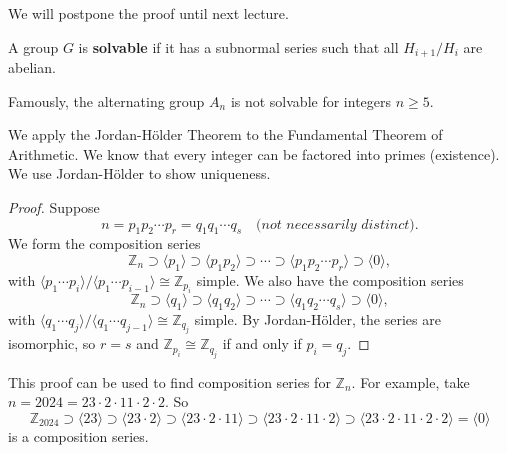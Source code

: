 We will postpone the proof until next lecture.

\begin{definition}
	A group $G$ is \textbf{solvable} if it has a subnormal series such that all $H_{i+1}/H_i$ are abelian.
\end{definition}

\begin{example}
	Famously, the alternating group $A_n$ is not solvable for integers $n\geq 5$.
\end{example}

\begin{example}
	We apply the Jordan-Hölder Theorem to the Fundamental Theorem of Arithmetic. We know that every integer can be factored into primes (existence). We use Jordan-Hölder to show uniqueness.

	\begin{proof}
	Suppose
	$$n=p_1p_2\cdots p_r=q_1q_1\cdots q_s\quad\textit{(not necessarily distinct)}.$$
	We form the composition series
	$$\mathbb Z_n\supset\langle p_1\rangle\supset\langle p_1p_2\rangle\supset\cdots\supset\langle p_1p_2\cdots p_r\rangle\supset\langle 0\rangle,$$
	with $\langle p_1\cdots p_i\rangle/\langle p_1\cdots p_{i-1}\rangle\cong\mathbb Z_{p_i}$ simple. We also have the composition series
	$$\mathbb Z_n\supset\langle q_1\rangle\supset\langle q_1q_2\rangle\supset\cdots\supset\langle q_1q_2\cdots q_s\rangle\supset\langle 0\rangle,$$
	with $\langle q_1\cdots q_j\rangle/\langle q_1\cdots q_{j-1}\rangle\cong\mathbb Z_{q_j}$ simple. By Jordan-Hölder, the series are isomorphic, so $r=s$ and $\mathbb Z_{p_i}\cong\mathbb Z_{q_j}$ if and only if $p_i=q_j$.
	\end{proof}

	This proof can be used to find composition series for $\mathbb Z_n$. For example, take $n=2024=23\cdot 2\cdot 11\cdot 2\cdot 2$. So
	$$\mathbb Z_{2024}\supset\langle 23\rangle\supset\langle 23\cdot 2\rangle\supset\langle 23\cdot 2\cdot 11\rangle\supset\langle 23\cdot 2\cdot 11\cdot 2\rangle\supset\langle 23\cdot 2\cdot 11\cdot 2\cdot 2\rangle=\langle 0\rangle$$
	is a composition series.
\end{example}